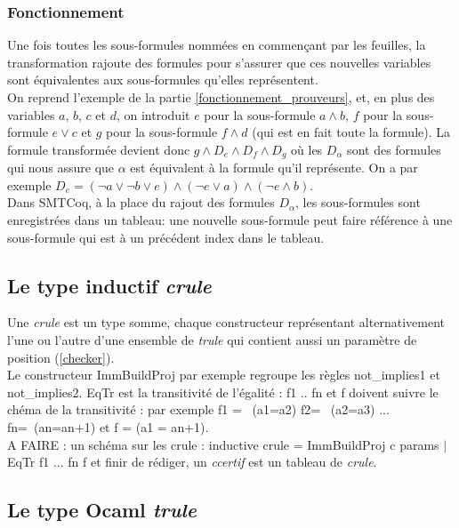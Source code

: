 \documentclass[11pt]{article}
\begin{document}
\subsubsection{Fonctionnement}

Une fois toutes les sous-formules nommées en commençant par les feuilles, la transformation rajoute des formules pour s'assurer que ces nouvelles variables sont équivalentes aux sous-formules qu'elles représentent. \\

On reprend l'exemple de la partie \ref{fonctionnement_prouveurs}, et, en plus des variables $a$, $b$, $c$ et $d$, on introduit $e$ pour la sous-formule $a \wedge b$, $f$ pour la sous-formule $e \vee c$ et $g$ pour la sous-formule $f \wedge d$ (qui est en fait toute la formule). La formule transformée devient donc $g \wedge D_e \wedge D_f \wedge D_g$ où les $D_\alpha$ sont des formules qui nous assure que $\alpha$ est équivalent à la formule qu'il représente. On a par exemple $D_e = (\neg a \vee \neg b \vee e) \wedge (\neg e \vee a) \wedge (\neg e \wedge b)$. \\

Dans SMTCoq, à la place du rajout des formules $D_\alpha$, les sous-formules sont enregistrées dans un tableau: une nouvelle sous-formule peut faire référence à une sous-formule qui est à un précédent index dans le tableau. 

\subsection{Le type inductif \textit{crule}}\label{regroupement}

Une \textit{crule} est un type somme, chaque constructeur représentant alternativement l'une ou l'autre d'une ensemble de \textit{trule} qui contient aussi un paramètre de position (\ref{checker}).\\

Le constructeur ImmBuildProj par exemple regroupe les règles not\_implies1 et not\_implies2. EqTr est la transitivité de l'égalité : f1 .. fn et f doivent suivre le chéma de la transitivité : par exemple f1 = ~(a1=a2) f2= ~(a2=a3) ... fn=~(an=a{n+1}) et f = (a1 = a{n+1}).\\

A FAIRE : un schéma sur les crule :  inductive crule = ImmBuildProj c params $|$ EqTr f1 ... fn f et finir de rédiger, un \textit{ccertif} est un tableau de \textit{crule}.

\subsection{Le type Ocaml \textit{trule}}
\end{document}
